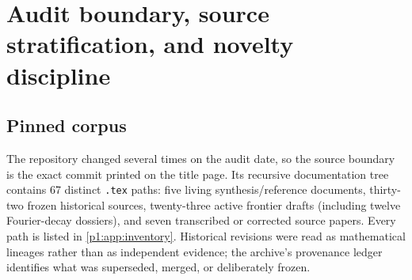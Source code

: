 \documentclass[11pt,oneside]{article}
\numberwithin{equation}{section}
\theoremstyle{definition}
\theoremstyle{remark}
\begin{document}
\begin{abstract}
Finally, a Mellin-reflection identity relates the endpoint Laplace transform directly to
the reflected spectral zeta.  For polynomial weights it explains the complete hierarchy
of logarithmic powers and periodic coefficients, gives a generalized lower-Lambert saddle,
and yields the leading inverse-endpoint law.  Reasonable conjectures and a detailed research
and Lean-formalization program conclude the report.  Numerical experiments were independently
implemented at high precision; the commented Python source and generated data accompany the
paper.
\end{abstract}


\clearpage

\section{Audit boundary, source stratification, and novelty discipline}
\label{p1:sec:audit}

\subsection{Pinned corpus}

The repository changed several times on the audit date, so the source boundary is the exact
commit printed on the title page.  Its recursive documentation tree contains 67 distinct
\texttt{.tex} paths: five living synthesis/reference documents, thirty-two frozen historical
sources, twenty-three active frontier drafts (including twelve Fourier-decay dossiers), and
seven transcribed or corrected source papers.  Every path is listed in
\cref{p1:app:inventory}.  Historical revisions were read as mathematical lineages rather than
as independent evidence; the archive's provenance ledger identifies what was superseded,
merged, or deliberately frozen.
\end{document}
